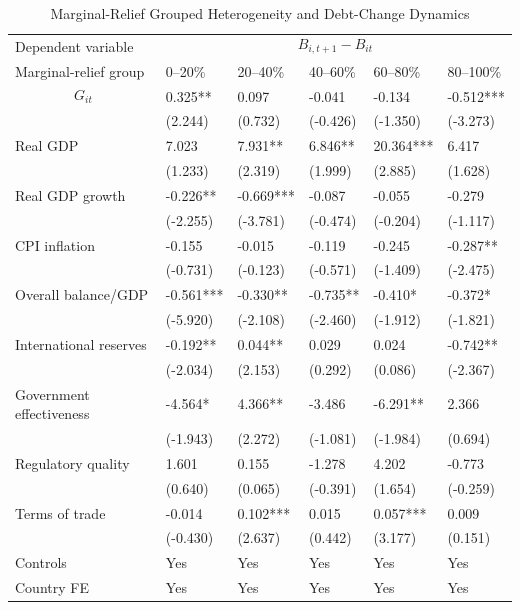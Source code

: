 \begin{table}[H]\centering
\begin{threeparttable}
\caption{Marginal-Relief Grouped Heterogeneity and Debt-Change Dynamics}
\label{tab:mG_group_heterogeneity_debt}
\scriptsize
\begin{tabularx}{\textwidth}{lYYYYY}
\toprule
Dependent variable &  \\
\cmidrule(lr){2-6}
Marginal-relief group & 0--20\% & 20--40\% & 40--60\% & 60--80\% & 80--100\% \\
\midrule
$$G_{it}$$ & 0.325** & 0.097 & -0.041 & -0.134 & -0.512*** \\
  & (2.244) & (0.732) & (-0.426) & (-1.350) & (-3.273) \\
Real GDP & 7.023 & 7.931** & 6.846** & 20.364*** & 6.417 \\
  & (1.233) & (2.319) & (1.999) & (2.885) & (1.628) \\
Real GDP growth & -0.226** & -0.669*** & -0.087 & -0.055 & -0.279 \\
  & (-2.255) & (-3.781) & (-0.474) & (-0.204) & (-1.117) \\
CPI inflation & -0.155 & -0.015 & -0.119 & -0.245 & -0.287** \\
  & (-0.731) & (-0.123) & (-0.571) & (-1.409) & (-2.475) \\
Overall balance/GDP & -0.561*** & -0.330** & -0.735** & -0.410* & -0.372* \\
  & (-5.920) & (-2.108) & (-2.460) & (-1.912) & (-1.821) \\
International reserves & -0.192** & 0.044** & 0.029 & 0.024 & -0.742** \\
  & (-2.034) & (2.153) & (0.292) & (0.086) & (-2.367) \\
Government effectiveness & -4.564* & 4.366** & -3.486 & -6.291** & 2.366 \\
  & (-1.943) & (2.272) & (-1.081) & (-1.984) & (0.694) \\
Regulatory quality & 1.601 & 0.155 & -1.278 & 4.202 & -0.773 \\
  & (0.640) & (0.065) & (-0.391) & (1.654) & (-0.259) \\
Terms of trade & -0.014 & 0.102*** & 0.015 & 0.057*** & 0.009 \\
  & (-0.430) & (2.637) & (0.442) & (3.177) & (0.151) \\
\midrule
Controls & Yes & Yes & Yes & Yes & Yes \\
Country FE & Yes & Yes & Yes & Yes & Yes \\

\end{tabularx}
\end{threeparttable}
\end{table}
